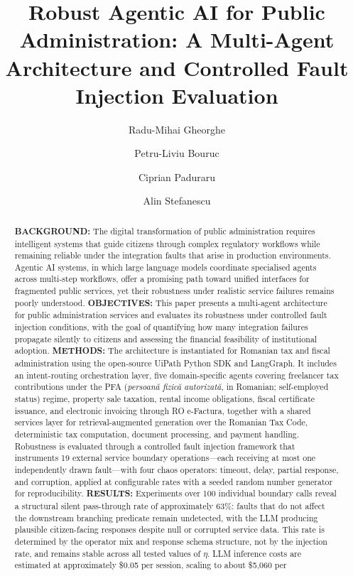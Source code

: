 \documentclass[3p,times,procedia]{elsarticle}
\begin{document}
\begin{frontmatter}


\title{Robust Agentic AI for Public Administration: A Multi-Agent Architecture and Controlled Fault Injection Evaluation}

\author[a,b]{Radu-Mihai Gheorghe}
\author[b]{Petru-Liviu Bouruc}
\author[b]{Ciprian Paduraru}
\author[b,c]{Alin Stefanescu}

\address[a]{UiPath, Romania}
\address[b]{University of Bucharest, Romania}
\address[c]{Institute for Logic and Data Science, Romania}

\begin{abstract}
\textbf{BACKGROUND:} The digital transformation of public administration requires intelligent systems that guide citizens through complex regulatory workflows while remaining reliable under the integration faults that arise in production environments. Agentic AI systems, in which large language models coordinate specialised agents across multi-step workflows, offer a promising path toward unified interfaces for fragmented public services, yet their robustness under realistic service failures remains poorly understood. \textbf{OBJECTIVES:} This paper presents a multi-agent architecture for public administration services and evaluates its robustness under controlled fault injection conditions, with the goal of quantifying how many integration failures propagate silently to citizens and assessing the financial feasibility of institutional adoption. \textbf{METHODS:} The architecture is instantiated for Romanian tax and fiscal administration using the open-source UiPath Python SDK and LangGraph. It includes an intent-routing orchestration layer, five domain-specific agents covering freelancer tax contributions under the PFA (\textit{persoan\u{a} fizic\u{a} autorizat\u{a}}, in Romanian; self-employed status) regime, property sale taxation, rental income obligations, fiscal certificate issuance, and electronic invoicing through RO e-Factura, together with a shared services layer for retrieval-augmented generation over the Romanian Tax Code, deterministic tax computation, document processing, and payment handling. Robustness is evaluated through a controlled fault injection framework that instruments 19 external service boundary operations---each receiving at most one independently drawn fault---with four chaos operators: timeout, delay, partial response, and corruption, applied at configurable rates with a seeded random number generator for reproducibility. \textbf{RESULTS:} Experiments over 100 individual boundary calls reveal a structural silent pass-through rate of approximately 63\%: faults that do not affect the downstream branching predicate remain undetected, with the LLM producing plausible citizen-facing responses despite null or corrupted service data. This rate is determined by the operator mix and response schema structure, not by the injection rate, and remains stable across all tested values of $\eta$. LLM inference costs are estimated at approximately \$0.05 per session, scaling to about \$5{,}060 per 
\end{abstract}
\end{frontmatter}
\end{document}
